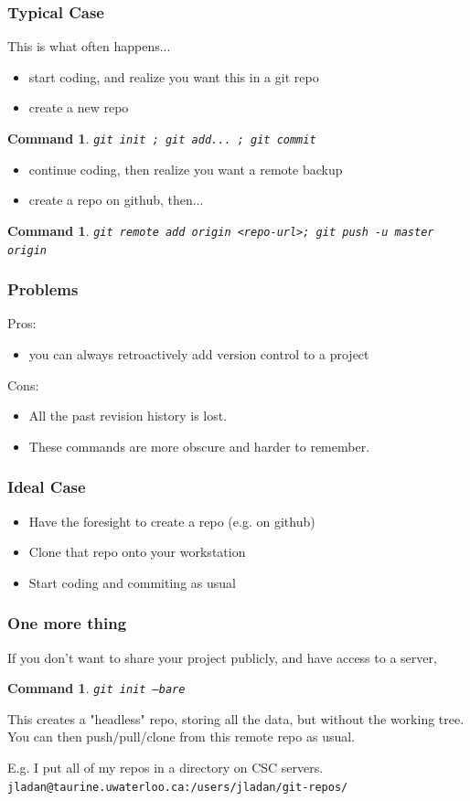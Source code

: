\documentclass{beamer}
\newtheorem{command}[theorem]{Command}
\begin{document}
\begin{frame}
    \frametitle{Typical Case}
    This is what often happens...
    \begin{itemize}
        \item start coding, and realize you want this in a git repo
        \item create a new repo
    \end{itemize}
    \begin{command}
        \texttt{git init ; git add... ; git commit}
    \end{command}
    \begin{itemize}
        \item continue coding, then realize you want a remote backup
        \item create a repo on github, then...
    \end{itemize}
    \begin{command}
        \texttt{git remote add origin <repo-url>; git push -u master origin}
    \end{command}
\end{frame}


\begin{frame}
    \frametitle{Problems}
    Pros:
    \begin{itemize}
        \item you can always retroactively add version control to a project
    \end{itemize}
    Cons:
    \begin{itemize}
        \item All the past revision history is lost.
        \item These commands are more obscure and harder to remember.
    \end{itemize}
\end{frame}

\begin{frame}
    \frametitle{Ideal Case}
    \begin{itemize}
        \item Have the foresight to create a repo (e.g. on github)
        \item Clone that repo onto your workstation
        \item Start coding and commiting as usual
    \end{itemize}
\end{frame}


\begin{frame}
    \frametitle{One more thing}
    If you don't want to share your project publicly, and have access to a server,
    \begin{command}
        \texttt{git init --bare}
    \end{command}
    This creates a "headless" repo, storing all the data, but without the working tree. You can then push/pull/clone from this remote repo as usual.
    \pause

    E.g. I put all of my repos in a directory on CSC servers. \texttt{jladan@taurine.uwaterloo.ca:/users/jladan/git-repos/}
\end{frame}
\end{document}
